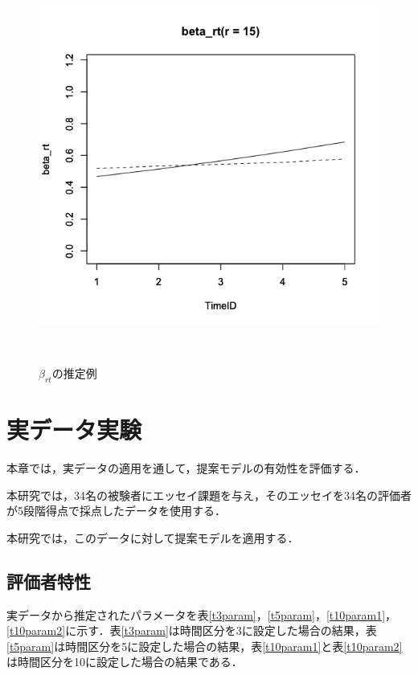 \documentclass[a4paper,11pt,oneside,openany]{jsbook}
\begin{document}
\begin{figure}[]
\begin{minipage}[b]{0.3\linewidth}
  \label{2}
 \end{minipage}
 \begin{minipage}[b]{0.3\linewidth}
  \centering
  \includegraphics[keepaspectratio,scale=0.25]{img/beta_rt_param3.png}
  \label{3}
 \end{minipage}\\
 \caption{$\beta_{rt}$の推定例}\label{beta_rt_recovery}
\end{figure}

\newpage
\chapter{実データ実験}
本章では，実データの適用を通して，提案モデルの有効性を評価する．

本研究では，34名の被験者にエッセイ課題を与え，そのエッセイを34名の評価者が5段階得点で採点したデータを使用する．

本研究では，このデータに対して提案モデルを適用する．
\section{評価者特性}
実データから推定されたパラメータを表\ref{t3param}，\ref{t5param}，\ref{t10param1}，\ref{t10param2}に示す．表\ref{t3param}は時間区分を3に設定した場合の結果，表\ref{t5param}は時間区分を5に設定した場合の結果，表\ref{t10param1}と表\ref{t10param2}は時間区分を10に設定した場合の結果である．
\end{document}

